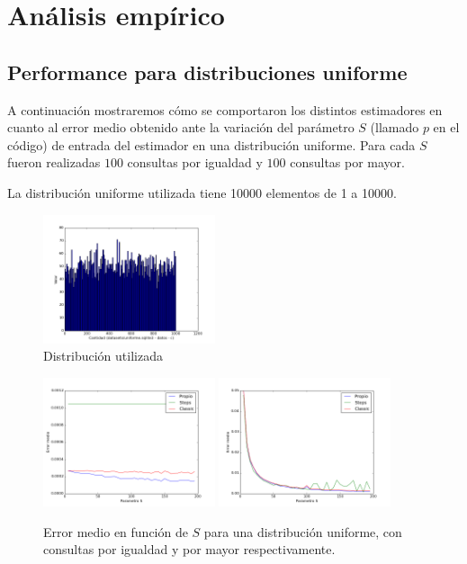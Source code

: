 \section{Análisis empírico}

\subsection{Performance para distribuciones uniforme}
A continuación mostraremos cómo se comportaron los distintos estimadores en cuanto al error medio obtenido ante la variación del parámetro $S$ (llamado $p$ en el código) de entrada del estimador en una distribución uniforme. Para cada $S$ fueron realizadas $100$ consultas por igualdad y $100$ consultas por mayor.

La distribución uniforme utilizada tiene 10000 elementos de 1 a 10000.


\begin{figure}[h!]  
  \centering
  \includegraphics[width=0.45\textwidth]{../source/datasets/img/uniforme}
  \caption{Distribución utilizada}
 \end{figure}
 
\begin{figure}[h!]  
  \centering
  \includegraphics[width=0.45\textwidth]{../source/datasets/img/uniformeEqual}
  \includegraphics[width=0.45\textwidth]{../source/datasets/img/uniformeGreater}
  \caption{Error medio en función de $S$ para una distribución uniforme, con consultas por igualdad y por mayor respectivamente.}
 \end{figure}
 
